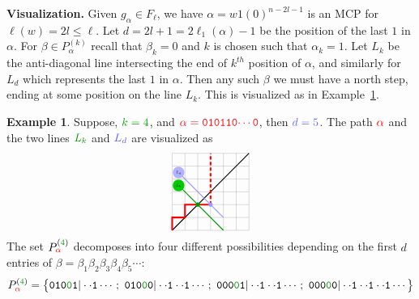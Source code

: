 \documentclass[12pt,reqno]{amsart}
\theoremstyle{plain}
\theoremstyle{definition}
\newtheorem{example}[theorem]{Example}
\begin{document}
\medskip
\noindent
\textbf{Visualization.} Given $g_\alpha\in F_\ell$, we have $\alpha = w1(0)^{n-2l-1}$ is an MCP for $\ell(w)= 2l \leq \ell $. 
Let $d=2l+1=2\ell_1(\alpha)-1$ be the position of the last $1$ in $\alpha$.
For $\beta \in P_\alpha^{(k)}$ recall that $\beta_k =0$ and $k$ is chosen such that $\alpha_k=1$. 
Let  $L_{k}$ be the anti-diagonal line intersecting the end of $k^{th}$ position of $\alpha$, and similarly for $L_{d}$  which represents the last $1$ in $\alpha$. 
Then any such $\beta$ we must have a north step, ending at some position on the line $L_k$. This is visualized as in Example~\ref{p_alpha_k_exmaple}.
\begin{example} \label{p_alpha_k_exmaple}
		Suppose, $\color{green!60!black} k=4$, and $\color{red}{\alpha} = \texttt{010110$\cdots$0}$, then $\color{blue!60} d=5$. The path $\color{red}{\alpha}$ and the two lines  
		$\color{green!60!black} L_k$ and $\color{blue!60} L_{d}$ are visualized as
$$ 
\begin{tikzpicture}[scale=0.4]
	  \draw[help lines] (0,0) grid +(6,6);
  	  \draw[solid, thick] (0,0) -- +(6,6);
	  \draw[draw = red, line width=1.5pt] (0,0)--(0,1)--(1,1)--(1,2)--(2,2)--(3,2);
	  \draw[densely dashed,  line width=1.5pt, draw=red] (3,2) -- (3,6); %
	  \draw[draw=green!60!black,  thick] (0.5, 3.5) -- (4,0);
	  \node at (0.5, 3.5) [circle, fill = green!80!black, scale=0.5]{$\scriptstyle L_k$};
	  \draw[draw=blue!40,  thick] (0.5, 4.5) -- (4,1);
	  \node at (0.5, 4.5) [circle, fill = blue!30, scale=0.5]{$\scriptstyle L_{d}$};
	  \node at (3,2) [circle, fill=blue!40, scale=0.4]{}; %
	  \node at (2,2) [circle, fill=green!60!black, scale=0.4]{}; %
      \end{tikzpicture}
$$
The set $P^{(\text{\textcolor{green!60!black}{4}})}_{\color{red}{\alpha}} $ decomposes into four different possibilities depending on the first $d$ entries of  $\beta=\beta_1\beta_2\beta_3\beta_4\beta_5\cdots$:
$$ P^{(\text{\textcolor{green!60!black}{4}})}_{\color{red}{\alpha}} = \big\{
	\texttt{010\textcolor{green!60!black}{0}1} |  \cdot \cdot  \texttt{1}  \cdots;\ 
	\texttt{010\textcolor{green!60!black}{0}0} |  \cdot \cdot  \texttt{1} \cdot \cdot  \texttt{1} \cdots ;\ 
	\texttt{000\textcolor{green!60!black}{0}1} |  \cdot \cdot  \texttt{1} \cdot \cdot \texttt{1}  \cdots;\ 
	\texttt{000\textcolor{green!60!black}{0}0} |  \cdot \cdot  \texttt{1}  \cdot \cdot  \texttt{1} \cdot \cdot \texttt{1} \cdots\big\}
$$
\end{example}
\end{document}

